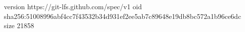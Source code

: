 version https://git-lfs.github.com/spec/v1
oid sha256:51008996abf4cc7f43532b34d931ef2ee5ab7c89648e19db8bc572a1b96ce6dc
size 21858
